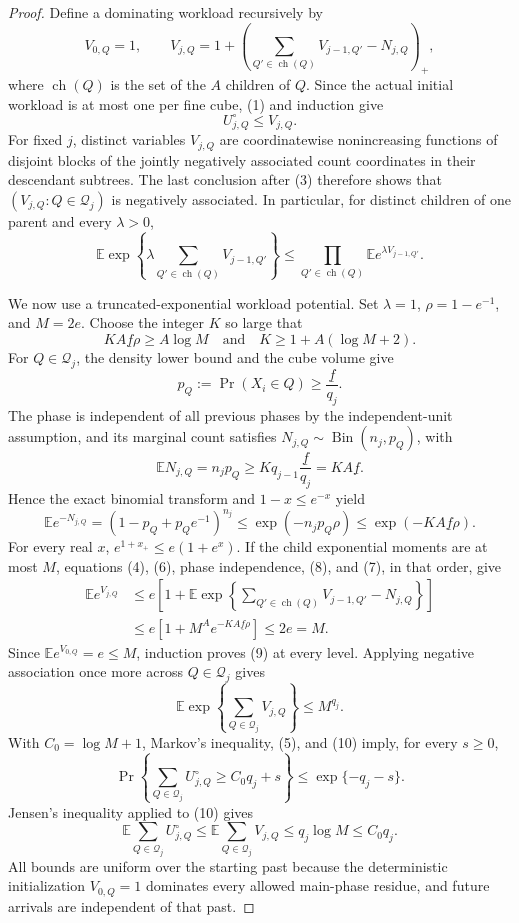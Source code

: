 \documentclass{article}
\begin{document}
\begin{proof}
Define a dominating workload recursively by
\[
 V_{0,Q}=1,\qquad
 V_{j,Q}=1+\left(\sum_{Q'\in\operatorname{ch}(Q)}V_{j-1,Q'}-N_{j,Q}\right)_+ , \tag{4}
\]
where \(\operatorname{ch}(Q)\) is the set of the \(A\) children of \(Q\).  Since the actual initial workload is at most one per fine cube, (1) and induction give
\[
 U^\circ_{j,Q}\le V_{j,Q}. \tag{5}
\]
For fixed \(j\), distinct variables \(V_{j,Q}\) are coordinatewise nonincreasing functions of disjoint blocks of the jointly negatively associated count coordinates in their descendant subtrees.  The last conclusion after (3) therefore shows that \((V_{j,Q}:Q\in\mathcal Q_j)\) is negatively associated.  In particular, for distinct children of one parent and every \(\lambda>0\),
\[
 \mathbb E\exp\!\left\{\lambda\sum_{Q'\in\operatorname{ch}(Q)}V_{j-1,Q'}\right\}
 \le\prod_{Q'\in\operatorname{ch}(Q)}\mathbb E e^{\lambda V_{j-1,Q'}}. \tag{6}
\]

We now use a truncated-exponential workload potential.  Set \(\lambda=1\), \(\rho=1-e^{-1}\), and \(M=2e\).  Choose the integer \(K\) so large that
\[
 KA\underline f\rho\ge A\log M
 \quad\text{and}\quad
 K\ge 1+A(\log M+2). \tag{7}
\]
For \(Q\in\mathcal Q_j\), the density lower bound and the cube volume give
\[
 p_Q:=\Pr(X_i\in Q)\ge \frac{\underline f}{q_j}.
\]
The phase is independent of all previous phases by the independent-unit assumption, and its marginal count satisfies \(N_{j,Q}\sim\operatorname{Bin}(n_j,p_Q)\), with
\[
 \mathbb E N_{j,Q}=n_jp_Q\ge Kq_{j-1}\frac{\underline f}{q_j}=KA\underline f.
\]
Hence the exact binomial transform and \(1-x\le e^{-x}\) yield
\[
 \mathbb E e^{-N_{j,Q}}
 =(1-p_Q+p_Qe^{-1})^{n_j}
 \le \exp(-n_jp_Q\rho)
 \le \exp(-KA\underline f\rho). \tag{8}
\]
For every real \(x\), \(e^{1+x_+}\le e(1+e^x)\).  If the child exponential moments are at most \(M\), equations (4), (6), phase independence, (8), and (7), in that order, give
\[
 \begin{aligned}
 \mathbb E e^{V_{j,Q}}
 &\le e\left[1+\mathbb E\exp\!\left\{\sum_{Q'\in\operatorname{ch}(Q)}V_{j-1,Q'}-N_{j,Q}\right\}\right]\\
 &\le e\left[1+M^A e^{-KA\underline f\rho}\right]
 \le 2e=M. \tag{9}
 \end{aligned}
\]
Since \(\mathbb Ee^{V_{0,Q}}=e\le M\), induction proves (9) at every level.  Applying negative association once more across \(Q\in\mathcal Q_j\) gives
\[
 \mathbb E\exp\!\left\{\sum_{Q\in\mathcal Q_j}V_{j,Q}\right\}
 \le M^{q_j}. \tag{10}
\]
With \(C_0=\log M+1\), Markov's inequality, (5), and (10) imply, for every \(s\ge0\),
\[
 \Pr\!\left\{\sum_{Q\in\mathcal Q_j}U^\circ_{j,Q}\ge C_0q_j+s\right\}
 \le \exp\{-q_j-s\}. \tag{11}
\]
Jensen's inequality applied to (10) gives
\[
 \mathbb E\sum_{Q\in\mathcal Q_j}U^\circ_{j,Q}
 \le \mathbb E\sum_{Q\in\mathcal Q_j}V_{j,Q}
 \le q_j\log M\le C_0q_j. \tag{12}
\]
All bounds are uniform over the starting past because the deterministic initialization \(V_{0,Q}=1\) dominates every allowed main-phase residue, and future arrivals are independent of that past.


\end{proof}
\end{document}
